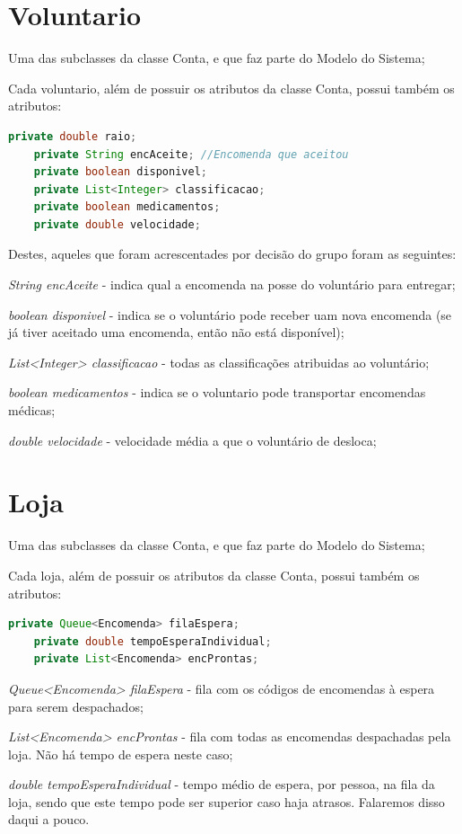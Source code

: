\documentclass[a4paper]{report}
\begin{document}
	
	\section{Voluntario}
	Uma das subclasses da classe Conta, e que faz parte do Modelo do Sistema;
	
	Cada voluntario, além de possuir os atributos da classe Conta, possui também os atributos:
	\begin{lstlisting}[language=Java]
	private double raio;
	private String encAceite; //Encomenda que aceitou
	private boolean disponivel;
	private List<Integer> classificacao;
	private boolean medicamentos;
	private double velocidade; 
	\end{lstlisting}
	Destes, aqueles que foram acrescentades por decisão do grupo foram as seguintes:
 	
\textit{String encAceite} - indica qual a encomenda na posse do voluntário para entregar;

\textit{boolean disponivel}  - indica se o voluntário pode receber uam nova encomenda (se já tiver aceitado uma encomenda, então não está disponível);

\textit{List<Integer> classificacao} - todas as classificações atribuidas ao voluntário;

\textit{boolean medicamentos} - indica se o voluntario pode transportar encomendas médicas;

\textit{double velocidade} - velocidade média a que o voluntário de desloca;
	
	\section{Loja}
	Uma das subclasses da classe Conta, e que faz parte do Modelo do Sistema;
	
	Cada loja, além de possuir os atributos da classe Conta, possui também os atributos:
	\begin{lstlisting}[language=Java]
	private Queue<Encomenda> filaEspera;
	private double tempoEsperaIndividual;
	private List<Encomenda> encProntas;
	\end{lstlisting}
	\textit{Queue<Encomenda> filaEspera} - fila com os códigos de encomendas à espera para serem despachados; 
	
	\textit{List<Encomenda> encProntas} - fila com todas as encomendas despachadas pela loja. Não há tempo de espera neste caso;
	
	\textit{double tempoEsperaIndividual} - tempo médio de espera, por pessoa, na fila da loja, sendo que este tempo pode ser superior caso haja atrasos. Falaremos disso daqui a pouco.
	
\end{document}
